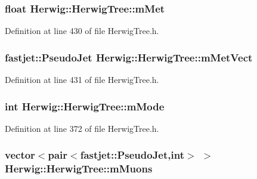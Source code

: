 \subsubsection[{\texorpdfstring{m\+Met}{mMet}}]{\setlength{\rightskip}{0pt plus 5cm}float Herwig\+::\+Herwig\+Tree\+::m\+Met\hspace{0.3cm}{\ttfamily [protected]}}\hypertarget{class_herwig_1_1_herwig_tree_a24471be817f37cd3f4f9eb2b984c9260}{}\label{class_herwig_1_1_herwig_tree_a24471be817f37cd3f4f9eb2b984c9260}


Definition at line 430 of file Herwig\+Tree.\+h.

\subsubsection[{\texorpdfstring{m\+Met\+Vect}{mMetVect}}]{\setlength{\rightskip}{0pt plus 5cm}fastjet\+::\+Pseudo\+Jet Herwig\+::\+Herwig\+Tree\+::m\+Met\+Vect\hspace{0.3cm}{\ttfamily [protected]}}\hypertarget{class_herwig_1_1_herwig_tree_a49d3c642cc2d55ee2d96dd063ad8f0ed}{}\label{class_herwig_1_1_herwig_tree_a49d3c642cc2d55ee2d96dd063ad8f0ed}


Definition at line 431 of file Herwig\+Tree.\+h.

\subsubsection[{\texorpdfstring{m\+Mode}{mMode}}]{\setlength{\rightskip}{0pt plus 5cm}int Herwig\+::\+Herwig\+Tree\+::m\+Mode\hspace{0.3cm}{\ttfamily [protected]}}\hypertarget{class_herwig_1_1_herwig_tree_a1d47a9344b42319950182483f08444d1}{}\label{class_herwig_1_1_herwig_tree_a1d47a9344b42319950182483f08444d1}


Definition at line 372 of file Herwig\+Tree.\+h.

\subsubsection[{\texorpdfstring{m\+Muons}{mMuons}}]{\setlength{\rightskip}{0pt plus 5cm}vector$<$pair$<$fastjet\+::\+Pseudo\+Jet,int$>$ $>$ Herwig\+::\+Herwig\+Tree\+::m\+Muons\hspace{0.3cm}{\ttfamily [protected]}}\hypertarget{class_herwig_1_1_herwig_tree_a03ab2e508845e15bd0967a055d5fc45b}{}\label{class_herwig_1_1_herwig_tree_a03ab2e508845e15bd0967a055d5fc45b}


